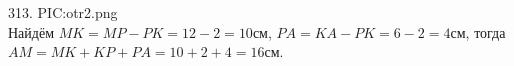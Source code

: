 313. {{PIC:otr2.png}}\\
Найдём $MK=MP-PK=12-2=10$см, $PA=KA-PK=6-2=4$см, тогда $AM=MK+KP+PA=10+2+4=16$см.\\
